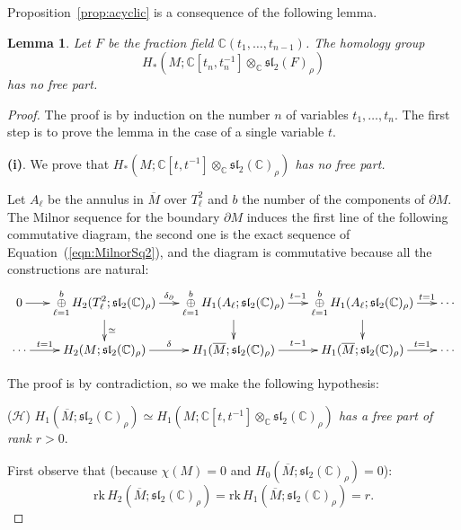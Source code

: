 \documentclass[a4paper]{amsart}
\theoremstyle{plain}
\newtheorem{lemma}[theorem]{Lemma}%
\theoremstyle{definition}
\theoremstyle{remark}
\newcommand{\CC}{{\mathbb C}}
\newcommand{\sllrho}{\mathfrak{sl}_2(\CC)_\rho}
\newcommand{\msll}[1]{\mathfrak{sl}_2(#1)}
\newcommand{\bord}{\partial}
\newcommand{\infcover}[1]{\overline{#1}}
\begin{document}
Proposition~\ref{prop:acyclic} is a consequence of the following lemma.
\begin{lemma}\label{lemma:free_bound}
  Let $F$ be the fraction field $\CC(t_1, \ldots, t_{n-1})$.  The
  homology group $$H_*(M; \CC[t_n, t_n^{-1}] \otimes_\CC \msll{F}_\rho)$$ has
  no free part.
\end{lemma}
\begin{proof}[Proof]
  The proof is by induction on the number $n$ of variables $t_1, \ldots, t_n$. 
  The first step is to prove the lemma in the case of a
  single variable $t$.

\medskip

\noindent \textbf{(i)}. 
We prove that \emph{$H_*(M; \CC[t, t^{-1}] \otimes_\CC \sllrho)$ has no free part.}
  
Let $A_\ell$ be the annulus in $\infcover{M}$ over $T_\ell^2$ and $b$ the
number of the components of $\bord M$. The Milnor sequence for the
boundary $\partial M$ induces the first line of the following
commutative diagram, the second one is the exact
sequence of Equation~(\ref{eqn:MilnorSq2}), and the diagram is commutative because
all the constructions are natural:
$$
\xymatrix@-.7pc{ 
  0 \ar[r] & 
  \displaystyle{\mathop{\oplus}_{\ell=1}^{b} H_2(T_\ell^2; \sllrho)} \ar[r]^-{\delta_\bord} \ar[d]^-\simeq & 
  \displaystyle{\mathop{\oplus}_{\ell=1}^{b} H_1(A_\ell; \sllrho)}  \ar[r]^{t - 1} \ar[d] & 
  \displaystyle{\mathop{\oplus}_{\ell=1}^{b} H_1(A_\ell; \sllrho)} \ar[r]^-{t = 1} \ar[d] & 
  \cdots \\
  \cdots \ar[r]^-{t=1} & 
  H_2(M; \sllrho) \ar[r]^-{\delta} &
  H_1(\infcover{M}; \sllrho) \ar[r]^{t - 1} & 
  H_1(\infcover{M}; \sllrho) \ar[r]^-{t = 1} & 
  \cdots }
$$


The proof is by contradiction, so we make the following hypothesis: 
 
 
\begin{center} 
{\noindent ($\mathcal{H}$) \quad
    \emph{
      $H_1(\infcover{M}; \sllrho) \simeq H_1(M; \CC[t, t^{-1}] \otimes_\CC \sllrho)$ 
       has a free part of rank $r>0$}. 
     }
\end{center}

\noindent First observe that (because $\chi(M) = 0$ and $H_0(\infcover{M}; \sllrho) = 0$): 
\begin{equation}\label{eqn:rank}
  \mathrm{rk} \, H_2(\infcover{M}; \sllrho) = 
  \mathrm{rk} \, H_1(\infcover{M}; \sllrho) = r.
\end{equation}
 

\end{proof}
\end{document}
